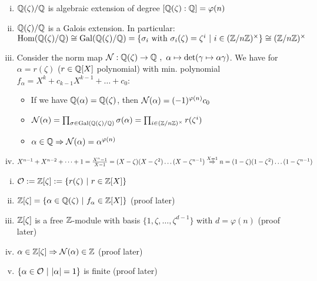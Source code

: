 \begin{remin} 
\begin{enumerate}[i)]
\item $\mathbb{Q}(\zeta)/\mathbb{Q}$ is algebraic extension of degree $[\mathbb{Q}(\zeta) : \mathbb{Q}] = \varphi(n)$
\item $\mathbb{Q}(\zeta)/\mathbb{Q}$ is a Galois extension. In particular:\\
$\operatorname{Hom}(\mathbb{Q}(\zeta)/ \mathbb{Q})\cong \operatorname{Gal}(\mathbb{Q}(\zeta)/\mathbb{Q})=\{\sigma_i \text{ with } \sigma_i(\zeta)=\zeta^i \ | \ i \in (\mathbb{Z}/n\mathbb{Z})^\times\} \cong (\mathbb{Z}/n\mathbb{Z})^\times$
\item Consider the norm map $\operatorname{\mathcal{N}}: \mathbb{Q}(\zeta) \to \mathbb{Q} \ ,\ \alpha \mapsto \det( \gamma \mapsto \alpha \gamma)$. 
We have for $\alpha = r(\zeta)$ ($r \in \mathbb{Q}[X]$ polynomial) with min. polynomial $f_\alpha = X^k+c_{k-1}X^{k-1} + \dots + c_0$:
\begin{itemize}
\item  If we have $\mathbb{Q}(\alpha)=\mathbb{Q}(\zeta)$, then $\operatorname{\mathcal{N}}(\alpha)=(-1)^{\varphi(n)} c_0$
\item $\operatorname{\mathcal{N}}(\alpha)= \prod_{\sigma \in \operatorname{Gal}(\mathbb{Q}(\zeta)/\mathbb{Q})} \sigma(\alpha) = \prod_{i \in (\mathbb{Z}/n\mathbb{Z})^\times} r(\zeta^i)$
\item $\alpha \in \mathbb{Q} \Rightarrow \operatorname{\mathcal{N}}(\alpha)=\alpha^{\varphi(n)}$
\end{itemize}
\item $X^{n-1}+X^{n-2}+\dots + 1 = \frac{X^n-1}{X-1}=(X - \zeta)(X-\zeta^2)\dots (X- \zeta^{n-1})\\
\stackrel{X=1}{\Rightarrow} n=(1-\zeta)(1-\zeta^2)\dots (1- \zeta^{n-1})$
\end{enumerate}
\end{remin}

\begin{remin}
\begin{enumerate}[i)]
\item $\mathcal{O}:=\mathbb{Z}[\zeta]:=\{ r(\zeta ) \ | \ r \in \mathbb{Z} [X]\}$
\item $\Z[\zeta]=\{\alpha \in \Q(\zeta) \ | \ f_\alpha \in \Z[X]\}$ (proof later)
\item $\mathbb{Z}[\zeta]$ is a free $\mathbb{Z}$-module with basis $\{1,\zeta, \dots, \zeta^{d-1}\}$ with $d=\varphi(n)$ (proof later)
\item $\alpha \in \mathbb{Z}[\zeta] \Rightarrow \operatorname{\mathcal{N}}(\alpha) \in \mathbb{Z}$ (proof later)
\item $\{\alpha \in \O \ | \ |\alpha|=1\}$ is finite (proof later)
\end{enumerate}
\end{remin}


